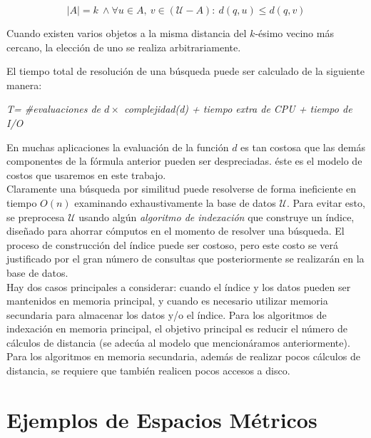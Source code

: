 \begin{description}
          \vspace{-3mm}
         \[|A| =k \ \wedge \forall u \in A,\  v \in ( \mathcal{U} - A) :
          \ d(q,u) \leq d(q,v)\]
          
          Cuando existen varios objetos a la misma distancia del $k$-\'esimo 
          vecino m\'as cercano, la elecci\'on de uno se realiza arbitrariamente.
           
\end{description}

El tiempo total de resoluci\'on de una b\'usqueda puede ser calculado de la
siguiente manera:\\

\centerline{
    \em T= \#evaluaciones  de $d \times $ complejidad(d) +  tiempo extra de
    CPU + tiempo de  I/O
}

En muchas aplicaciones  la evaluaci\'on de la funci\'on $d$ es tan costosa
que las dem\'as componentes de la f\'ormula anterior pueden ser despreciadas.
\'este es el modelo de costos  que usaremos en este trabajo.\\

Claramente una b\'usqueda por similitud puede resolverse de forma
ineficiente en tiempo  $O(n)$ examinando exhaustivamente la base de datos $\mathcal{U}$.
Para evitar esto, se preprocesa $\mathcal{U}$ usando alg\'un {\em algoritmo de
indexaci\'on} que construye  un 
\'indice, dise\~nado  para ahorrar c\'omputos en el momento de resolver una b\'usqueda.
El proceso de  construcci\'on del \'indice puede ser costoso, pero este costo
se ver\'a justificado por el gran n\'umero de consultas que posteriormente se
realizar\'an en la base de datos.\\

Hay dos casos principales a considerar: cuando el \'indice y los datos pueden ser
mantenidos en memoria principal, y cuando es necesario utilizar memoria secundaria
para almacenar los datos y/o el \'indice. Para los algoritmos de indexaci\'on
en memoria principal, el objetivo principal es reducir el n\'umero de c\'alculos de distancia
(se adec\'ua al modelo que mencion\'aramos anteriormente).\\

Para los algoritmos en memoria secundaria, adem\'as
de realizar pocos c\'alculos de distancia, se requiere que tambi\'en realicen
pocos accesos a disco. 


\section{Ejemplos de Espacios M\'etricos}

